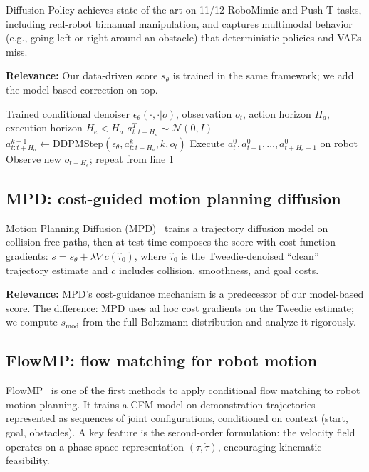 \documentclass[11pt,letterpaper]{article}
\theoremstyle{plain}
\theoremstyle{definition}
\theoremstyle{remark}
\newcommand{\calN}{\mathcal{N}}
\newcommand{\grad}{\nabla}
\newcommand{\smodel}{s_{\mathrm{mod}}}
\begin{document}
Diffusion Policy achieves state-of-the-art on 11/12 RoboMimic and
Push-T tasks, including real-robot bimanual manipulation, and captures
multimodal behavior (e.g., going left or right around an obstacle) that
deterministic policies and VAEs miss.

\textbf{Relevance:} Our data-driven score $s_\theta$ is trained in the
same framework; we add the model-based correction on top.

\begin{algorithm}[ht]
\caption{Diffusion Policy: Receding-Horizon Action Generation}\label{alg:diffpolicy}
\begin{algorithmic}[1]
\Require Trained conditional denoiser $\epsilon_\theta(\cdot,\cdot|o)$, observation $o_t$,
  action horizon $H_a$, execution horizon $H_e<H_a$
\State $a^T_{t:t+H_a}\sim\calN(0,I)$ 
  \State $a^{k-1}_{t:t+H_a}\gets\mathrm{DDPMStep}(\epsilon_\theta,a^k_{t:t+H_a},k,o_t)$
\EndFor
\State Execute $a^0_{t},a^0_{t+1},\ldots,a^0_{t+H_e-1}$ on robot 
\State Observe new $o_{t+H_e}$; repeat from line 1 
\end{algorithmic}
\end{algorithm}

\subsection{MPD: cost-guided motion planning diffusion}

Motion Planning Diffusion (MPD)~\citep{carvalho2023mpd} trains a
trajectory diffusion model on collision-free paths, then at test time
composes the score with cost-function gradients:
$\tilde s=s_\theta+\lambda\grad c(\hat\tau_0)$,
where $\hat\tau_0$ is the Tweedie-denoised ``clean'' trajectory
estimate and $c$ includes collision, smoothness, and goal costs.

\textbf{Relevance:} MPD's cost-guidance mechanism is a predecessor of
our model-based score.  The difference: MPD uses ad hoc cost gradients
on the Tweedie estimate; we compute $\smodel$ from the full Boltzmann
distribution and analyze it rigorously.

\subsection{FlowMP: flow matching for robot motion}

FlowMP~\citep{flowmp} is one of the first methods to apply conditional
flow matching to robot motion planning.  It trains a CFM model on
demonstration trajectories represented as sequences of joint
configurations, conditioned on context (start, goal, obstacles).  A key
feature is the second-order formulation: the velocity field operates on
a phase-space representation $(\tau,\dot\tau)$, encouraging kinematic
feasibility.
\end{document}
